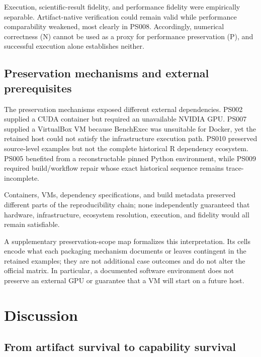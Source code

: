 \documentclass[a4paper,fleqn]{cas-dc}
\begin{document}
\begin{tcolorbox}[answerbox,title=\textbf{RQ4 answer in brief}]
Execution, scientific-result fidelity, and performance fidelity were empirically separable. Artifact-native verification could remain valid while performance comparability weakened, most clearly in PS008. Accordingly, numerical correctness (N) cannot be used as a proxy for performance preservation (P), and successful execution alone establishes neither.
\end{tcolorbox}

\subsection{Preservation mechanisms and external prerequisites}

The preservation mechanisms exposed different external dependencies. PS002 supplied a CUDA container but required an unavailable NVIDIA GPU. PS007 supplied a VirtualBox VM because BenchExec was unsuitable for Docker, yet the retained host could not satisfy the infrastructure execution path. PS010 preserved source-level examples but not the complete historical R dependency ecosystem. PS005 benefited from a reconstructable pinned Python environment, while PS009 required build/workflow repair whose exact historical sequence remains trace-incomplete.

Containers, VMs, dependency specifications, and build metadata preserved different parts of the reproducibility chain; none independently guaranteed that hardware, infrastructure, ecosystem resolution, execution, and fidelity would all remain satisfiable.

A supplementary preservation-scope map formalizes this interpretation. Its cells encode what each packaging mechanism documents or leaves contingent in the retained examples; they are not additional case outcomes and do not alter the official matrix. In particular, a documented software environment does not preserve an external GPU or guarantee that a VM will start on a future host.

\section{Discussion}

\subsection{From artifact survival to capability survival}
\end{document}
